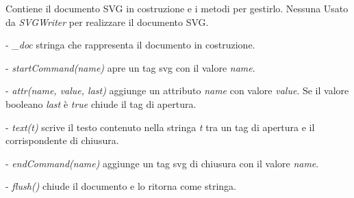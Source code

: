 Contiene il documento SVG in costruzione e i metodi per gestirlo.
Nessuna
Usato da \textit{SVGWriter} per realizzare il documento SVG.
\begin{elencopuntato}[\normindent]
\item[-] \textit{{\_}doc} stringa che rappresenta il documento in costruzione.
\end{elencopuntato}
\begin{elencopuntato}[\normindent]
\item[-]  \textit{startCommand(name)} apre un tag svg con il valore \textit{name}. 
\item[-]  \textit{attr(name, value, last)} aggiunge un attributo \textit{name} con valore \textit{value}. Se il valore booleano \textit{last} \`e \textit{true} chiude il tag di apertura.
\item[-]  \textit{text(t)} scrive il testo contenuto nella stringa \textit{t} tra un tag di apertura e il corrispondente di chiusura.
\item[-]  \textit{endCommand(name)} aggiunge un tag svg di chiusura con il valore \textit{name}.
\item[-]  \textit{flush()} chiude il documento e lo ritorna come stringa.
\end{elencopuntato}



